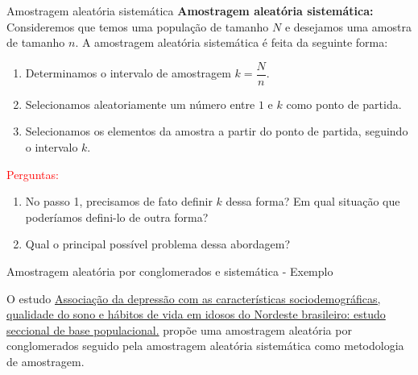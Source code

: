     \begin{frame}{Amostragem aleatória sistemática}
        \textbf{Amostragem aleatória sistemática: }Consideremos que temos uma população de tamanho $N$ e desejamos uma amostra de tamanho $n$.
        A amostragem aleatória sistemática é feita da seguinte forma:
        \begin{enumerate}
            \item Determinamos o intervalo de amostragem $k = \dfrac{N}{n}$.
            \pause
            \item Selecionamos aleatoriamente um número entre $1$ e $k$ como ponto de partida. 
            \pause
            \item Selecionamos os elementos da amostra a partir do ponto de partida, seguindo o intervalo $k$.
        \end{enumerate}
        \pause 
        \textcolor{red}{Perguntas:}
        \begin{enumerate}
            \item  No passo 1, precisamos de fato definir $k$ dessa forma? Em qual situação que poderíamos defini-lo de outra forma?
            \pause
            \item Qual o principal possível problema dessa abordagem?
        \end{enumerate}
       
        \pause

\end{frame}

\begin{frame}{Amostragem aleatória por conglomerados e sistemática - Exemplo}
    \begin{exemplo}
         O estudo \href{https://www.scielo.br/j/rbgg/a/PtkLqMxhrj8b7tQwBVgnr8z/abstract/?lang=pt}{Associação da depressão com as características sociodemográficas, qualidade do sono e hábitos de vida em idosos do Nordeste brasileiro: estudo seccional de base populacional.} 
    propõe uma amostragem aleatória por conglomerados seguido pela amostragem aleatória sistemática como metodologia de amostragem.
    \end{exemplo}
   
\end{frame}


